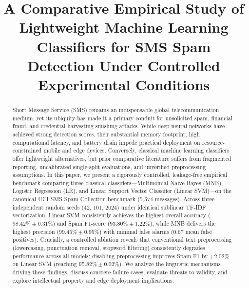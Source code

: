\documentclass[conference]{IEEEtran}
\begin{document}
\title{A Comparative Empirical Study of Lightweight Machine Learning Classifiers for SMS Spam Detection Under Controlled Experimental Conditions}

\author{
}

\maketitle

\begin{abstract}
Short Message Service (SMS) remains an indispensable global telecommunication medium, yet its ubiquity has made it a primary conduit for unsolicited spam, financial fraud, and credential-harvesting smishing attacks. While deep neural networks have achieved strong detection scores, their substantial memory footprint, high computational latency, and battery drain impede practical deployment on resource-constrained mobile and edge devices. Conversely, classical machine learning classifiers offer lightweight alternatives, but prior comparative literature suffers from fragmented reporting, uncalibrated single-split evaluations, and unverified preprocessing assumptions. In this paper, we present a rigorously controlled, leakage-free empirical benchmark comparing three classical classifiers---Multinomial Naive Bayes (MNB), Logistic Regression (LR), and Linear Support Vector Classifier (Linear SVM)---on the canonical UCI SMS Spam Collection benchmark (5,574 messages). Across three independent random seeds (42, 101, 2024) under identical sublinear TF-IDF vectorization, Linear SVM consistently achieves the highest overall accuracy ($98.42\% \pm 0.31\%$) and Spam F1-score ($93.80\% \pm 1.22\%$), while MNB delivers the highest precision ($99.45\% \pm 0.95\%$) with minimal false alarms (0.67 mean false positives). Crucially, a controlled ablation reveals that conventional text preprocessing (lowercasing, punctuation removal, stopword filtering) consistently degrades performance across all models; disabling preprocessing improves Spam F1 by $+2.02\%$ on Linear SVM (reaching $95.82\% \pm 0.02\%$). We analyze the linguistic mechanisms driving these findings, discuss concrete failure cases, evaluate threats to validity, and explore intellectual property and edge deployment implications.
\end{abstract}
\end{document}
